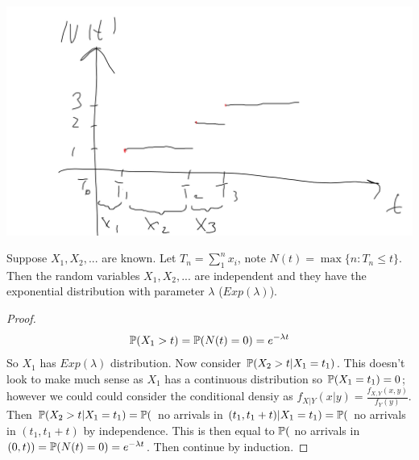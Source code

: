 \documentclass[a4paper]{article}
\begin{document}
\includegraphics[scale=0.5]{image/AP_01.png}

\begin{thm}
Suppose $X_1,X_2,...$ are known. Let $T_n = \sum_1^n x_i$, note $N(t) = \max\{n:T_n \leq t\}$. Then the random variables $X_1,X_2,...$ are independent and they have the exponential distribution with parameter $\lambda$ ($Exp(\lambda)$).
\begin{proof}
\begin{equation*}
\begin{aligned}
\P(X_1 > t) = \P(N(t) = 0) = e^{-\lambda t}
\end{aligned}
\end{equation*}
So $X_1$ has $Exp(\lambda)$ distribution. Now consider $\P(X_2>t|X_1=t_1)$. This doesn't look to make much sense as $X_1$ has a continuous distribution so $\P(X_1=t_1) = 0$; however we could could consider the conditional densiy as $f_{X|Y} (x|y) =\frac{f_{X,Y}(x,y)}{f_Y(y)}$. Then $\P(X_2>t|X_1=t_1) = \P($ no arrivals in $(t_1,t_1+t)|X_1=t_1) = \P($ no arrivals in $(t_1,t_1+t)$ by independence. This is then equal to $\P($ no arrivals in $(0,t)) = \P(N(t)=0) = e^{-\lambda t}$. Then continue by induction.
\end{proof}
\end{thm}
\end{document}
